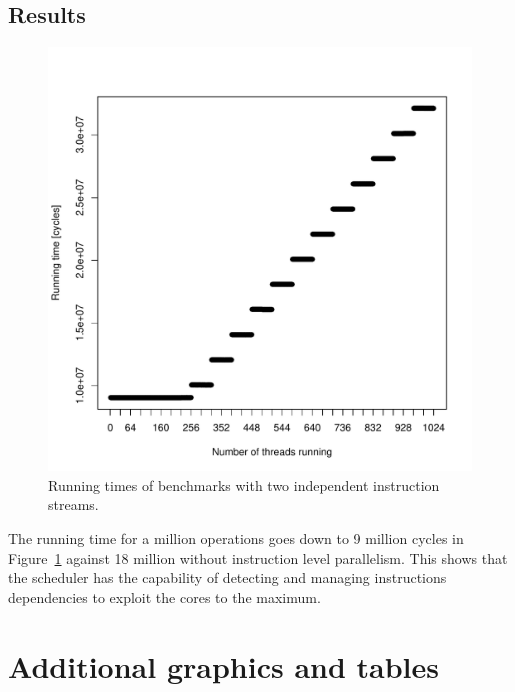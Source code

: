 \documentclass{report}
\def \scalingfactor{.8}
\begin{document}
    \subsection{Results}
    \begin{figure}[H]
		\centering
        \includegraphics[width=\scalingfactor\linewidth]{"graphics/ilp_graph"}
		\vspace{-15pt}
		\captionsetup{justification=centering}
        \caption{Running times of benchmarks with two independent instruction streams.}
        \label{fig:ilp_results}
    \end{figure}

    The running time for a million operations goes down to 9 million cycles in Figure~\ref{fig:ilp_results}
    against 18 million without instruction level parallelism. This shows that the scheduler has the
    capability of detecting and managing instructions dependencies to exploit the cores to the maximum.
    
\section{Additional graphics and tables}
\end{document}
